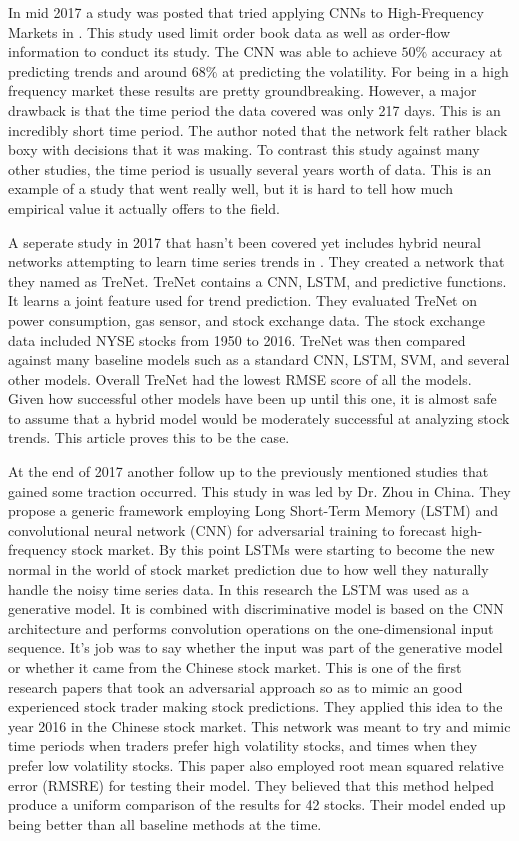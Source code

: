 \documentclass{article}
\theoremstyle{plain}
\theoremstyle{definition}
\numberwithin{equation}{section}
\numberwithin{theorem}{section}
\numberwithin{lemma}{section}
\numberwithin{definition}{section}
\numberwithin{proposition}{section}
\numberwithin{corollary}{section}
\begin{document}
	
	 In mid 2017 a study was posted that tried applying CNNs to High-Frequency Markets in \cite{Doering2017}. This study used limit order book data as well as order-flow information to conduct its study. The CNN was able to achieve $50\%$ accuracy at predicting trends and around $68\%$ at predicting the volatility. For being in a high frequency market these results are pretty groundbreaking. However, a major drawback is that the time period the data covered was only 217 days. This is an incredibly short time period. The author noted that the network felt rather black boxy with decisions that it was making. To contrast this study against many other studies, the time period is usually several years worth of data. This is an example of a study that went really well, but it is hard to tell how much empirical value it actually offers to the field.
	 
	 
	 A seperate study in 2017 that hasn't been covered yet includes hybrid neural networks attempting to learn time series trends in \cite{Lin2017}. They created a network that they named as TreNet. TreNet contains a CNN, LSTM, and predictive functions. It learns a joint feature used for trend prediction. They evaluated TreNet on power consumption, gas sensor, and stock exchange data. The stock exchange data included NYSE stocks from 1950 to 2016. TreNet was then compared against many baseline models such as a standard CNN, LSTM, SVM, and several other models. Overall TreNet had the lowest RMSE score of all the models. Given how successful other models have been up until this one, it is almost safe to assume that a hybrid model would be moderately successful at analyzing stock trends. This article proves this to be the case.
	 
	 At the end of 2017 another follow up to the previously mentioned studies that gained some traction occurred. This study in \cite{Zhou2018StockMP} was led by Dr. Zhou in China. They propose a generic framework employing Long Short-Term Memory (LSTM) and
	 convolutional neural network (CNN) for adversarial training to forecast high-frequency stock market. By this point LSTMs were starting to become the new normal in the world of stock market prediction due to how well they naturally handle the noisy time series data. In this research the LSTM was used as a generative model. It is combined with discriminative model is based on the CNN architecture and performs convolution operations on the one-dimensional input sequence. It's job was to say whether the input was part of the generative model or whether it came from the Chinese stock market. This is one of the first research papers that took an adversarial approach so as to mimic an good experienced stock trader making stock predictions. They applied this idea to the year 2016 in the Chinese stock market. This network was meant to try and mimic time periods when traders prefer high volatility stocks, and times when they prefer low volatility stocks. This paper also employed root mean squared relative error (RMSRE) for testing their model. They believed that this method helped produce a uniform comparison of the results for 42 stocks. Their model ended up being better than all baseline methods at the time. 
	 
\end{document}
